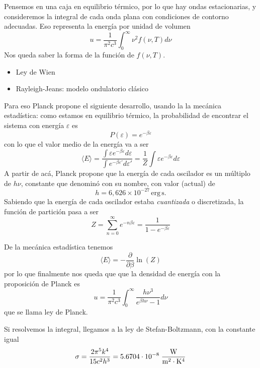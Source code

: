 \documentclass{book}
\numberwithin{equation}{section} %
\begin{document}
Pensemos en una caja en equilibrio térmico, por lo que hay ondas estacionarias, y consideremos la integral de cada onda plana con condiciones de contorno adecuadas.
Eso representa la energía por unidad de volumen
\begin{equation}
 u = \frac{1}{\pi^2 c^3} \int^\infty_0 \nu^2 f(\nu,T) d\nu
\end{equation}
Nos queda saber la forma de la función de $f(\nu,T)$.

\begin{itemize}
    \item{Ley de Wien}
    \item{Rayleigh-Jeans: modelo ondulatorio clásico}
\end{itemize}

Para eso Planck propone el siguiente desarrollo, usando la la mecánica estadística: 
como estamos en equilibrio térmico, la probabilidad de encontrar el sistema con energía $\varepsilon$ es 
\[ P(\varepsilon) = e^{-\beta \varepsilon}\]
con lo que el valor medio de la energía va a ser
\[ \langle E \rangle = \frac{\int \varepsilon e^{-\beta \varepsilon} d\varepsilon}{\int e^{-\beta \varepsilon'} d\varepsilon'} = \frac{1}{Z} \int \varepsilon e^{-\beta \varepsilon} d\varepsilon\]
A partir de acá, Planck propone que la energía de cada oscilador es un múltiplo de $h\nu$, constante que denominó con su nombre, con valor (actual) de
\begin{equation}
h = 6,626 \times 10^{-27}\,\text{erg}\,\text{s}.
\end{equation}
Sabiendo que la energía de cada oscilador estaba \emph{cuantizada} o discretizada, la función de partición pasa a ser
\[ Z = \sum^\infty_{n = 0} e^{-n \beta \varepsilon} = \frac{1}{1 - e^{-\beta \varepsilon}}\]

De la mecánica estadística tenemos
\begin{equation}
    \langle E \rangle = - \frac{\partial}{\partial \beta} \ln(Z)
\end{equation}
por lo que finalmente nos queda que que la densidad de energía con la proposición de Planck es
\begin{equation}
  u = \frac{1}{\pi^2 c^3} \int^\infty_0 \frac{h \nu^3}{e^{\beta h \nu} - 1} d\nu
\end{equation}
que se llama ley de Planck.

Si resolvemos la integral, llegamos a la ley  de Stefan-Boltzmann, con la constante igual 
\begin{equation}
\sigma=\frac{2\pi^5 k^4}{15c^2h^3}= 5.6704 \cdot 10^{-8}\; \rm\frac {W}{m^2 \cdot K^4}
\end{equation}
\end{document}
